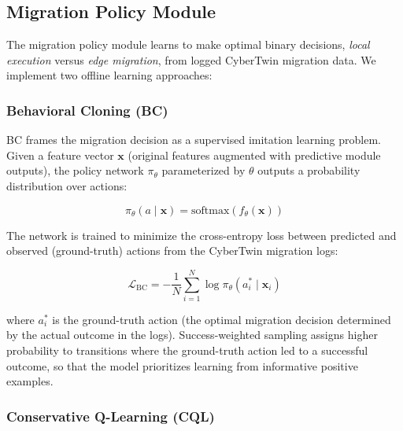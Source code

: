 \documentclass[10pt,letterpaper]{article}
\begin{document}
\subsection*{Migration Policy Module}
\label{sec:policy}

The migration policy module learns to make optimal binary decisions, \emph{local execution} versus \emph{edge migration}, from logged CyberTwin migration data. We implement two offline learning approaches:

\subsubsection{Behavioral Cloning (BC)}

BC frames the migration decision as a supervised imitation learning problem. Given a feature vector $\mathbf{x}$ (original features augmented with predictive module outputs), the policy network $\pi_\theta$ parameterized by $\theta$ outputs a probability distribution over actions:

\begin{equation}
\pi_\theta(a \mid \mathbf{x}) = \text{softmax}(f_\theta(\mathbf{x}))
\end{equation}

The network is trained to minimize the cross-entropy loss between predicted and observed (ground-truth) actions from the CyberTwin migration logs:

\begin{equation}
\mathcal{L}_{\text{BC}} = -\frac{1}{N} \sum_{i=1}^{N} \log \pi_\theta(a_i^* \mid \mathbf{x}_i)
\end{equation}

where $a_i^*$ is the ground-truth action (the optimal migration decision determined by the actual outcome in the logs). Success-weighted sampling assigns higher probability to transitions where the ground-truth action led to a successful outcome, so that the model prioritizes learning from informative positive examples.

\subsubsection{Conservative Q-Learning (CQL)}
\end{document}
